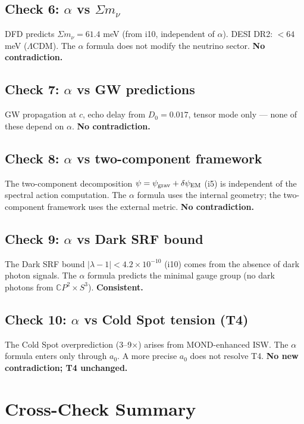 \documentclass[11pt,a4paper]{article}
\newcommand{\CP}{\mathbb{C}P}
\begin{document}
\subsection{Check 6: $\alpha$ vs $\Sigma m_\nu$}

DFD predicts $\Sigma m_\nu = 61.4$ meV (from i10, independent of $\alpha$). DESI DR2: $< 64$ meV ($\Lambda$CDM). The $\alpha$ formula does not modify the neutrino sector. \textbf{No contradiction.}

\subsection{Check 7: $\alpha$ vs GW predictions}

GW propagation at $c$, echo delay from $D_0 = 0.017$, tensor mode only --- none of these depend on $\alpha$. \textbf{No contradiction.}

\subsection{Check 8: $\alpha$ vs two-component framework}

The two-component decomposition $\psi = \psi_{\rm grav} + \delta\psi_{\rm EM}$ (i5) is independent of the spectral action computation. The $\alpha$ formula uses the internal geometry; the two-component framework uses the external metric. \textbf{No contradiction.}

\subsection{Check 9: $\alpha$ vs Dark SRF bound}

The Dark SRF bound $|\lambda - 1| < 4.2 \times 10^{-10}$ (i10) comes from the absence of dark photon signals. The $\alpha$ formula predicts the minimal gauge group (no dark photons from $\CP^2 \times S^3$). \textbf{Consistent.}

\subsection{Check 10: $\alpha$ vs Cold Spot tension (T4)}

The Cold Spot overprediction (3--9$\times$) arises from MOND-enhanced ISW. The $\alpha$ formula enters only through $a_0$. A more precise $a_0$ does not resolve T4. \textbf{No new contradiction; T4 unchanged.}

\section{Cross-Check Summary}
\end{document}

